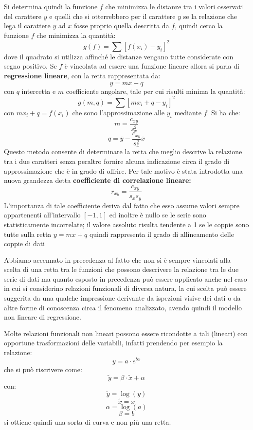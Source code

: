 \documentclass[a4paper,12pt, oneside]{book}
\begin{document}
Si determina quindi la funzione $f$ che minimizza le distanze tra i valori osservati del carattere $y$
e quelli che si otterrebbero per il carattere $y$ se la relazione che lega il carattere $y$ ad $x$ 
fosse proprio quella descritta da $f$, quindi cerco la funzione $f$ che minimizza la quantità:
\[ g(f) = \sum[f(x_i)-y_i]^2 \]
dove il quadrato si utilizza affinché le distanze vengano tutte considerate con segno positivo.\newline
Se $f$ è vincolata ad essere una funzione lineare allora si parla di \textbf{regressione lineare}, con la retta rappresentata da:
\[ y=mx+q \]
con $q$ intercetta e $m$ coefficiente angolare, tale per cui risulti minima la quantità:
\[ g(m,q) = \sum[mx_i+q-y_i]^2 \]
con $mx_i+q=f(x_i)$ che sono l'approssimazione alle $y_i$ mediante $f$. Si ha che:
\[ m = \frac{c_{xy}}{s^2_x} \]
\[ q = \overline{y} - \frac{c_{xy}}{s_x^2}\overline{x} \]
Questo metodo consente di determinare la retta che meglio descrive la relazione tra i due caratteri 
senza peraltro fornire alcuna indicazione circa il grado di approssimazione che è in grado di offrire.\newline
Per tale motivo è stata introdotta una nuova grandezza detta \textbf{coefficiente di correlazione lineare:}
\[ r_{xy}=\frac{c_{xy}}{s_xs_y} \]
L'importanza di tale coefficiente deriva dal fatto che esso assume valori sempre appartenenti all'intervallo $[-1, 1]$ 
ed inoltre è nullo se le serie sono statisticamente incorrelate; il valore assoluto risulta tendente a 1
se le coppie sono tutte sulla retta $y=mx+q$ quindi rappresenta il grado di allineamento delle coppie di dati

Abbiamo accennato in precedenza al fatto che non si è sempre vincolati alla scelta di una retta tra le funzioni
che possono descrivere la relazione tra le due serie di dati ma quanto esposto in precedenza può essere applicato 
anche nel caso in cui si considerino relazioni funzionali di diversa natura, la cui scelta può essere suggerita
da una qualche impressione derivante da ispezioni visive dei dati o da altre forme di conoscenza circa il fenomeno analizzato,
avendo quindi il modello non lineare di regressione.

Molte relazioni funzionali non lineari possono essere ricondotte a tali (lineari) con opportune trasformazioni delle variabili,
infatti prendendo per esempio la relazione:
\[ y = a\cdot e^{bx} \]
che si può riscrivere come:
\[ \widetilde{y} = \beta\cdot \widetilde{x}+\alpha \]
con: 
\[ \widetilde{y}=\log(y) \]
\[ \widetilde{x}=x \]
\[ \alpha=\log(a) \]
\[ \beta = b \]
si ottiene quindi una sorta di curva e non più una retta.
\end{document}
